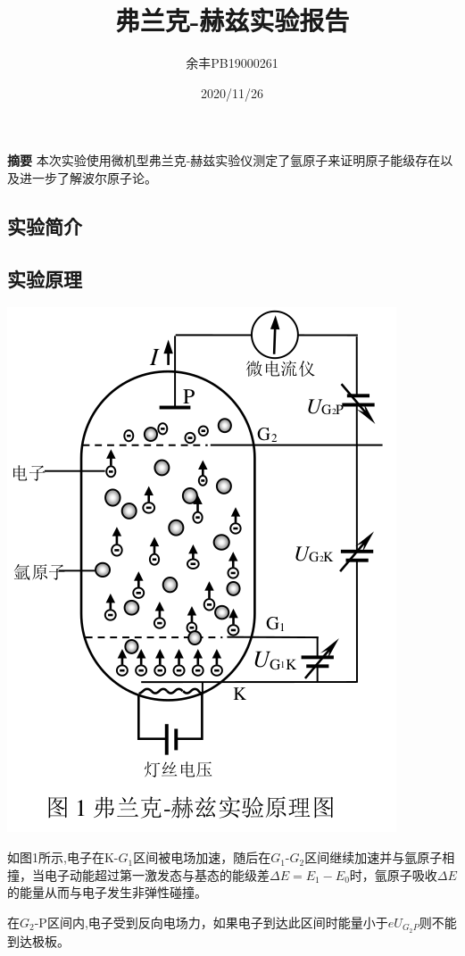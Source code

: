 \documentclass[UEF8]{ctexart}
\title{弗兰克-赫兹实验报告}
\author{余丰\quad PB19000261}
\date{2020/11/26}
\begin{document}
\maketitle

{\bfseries 摘要} \quad 本次实验使用微机型弗兰克-赫兹实验仪测定了氩原子来证明原子能级存在以及进一步了解波尔原子论。

\begin{multicols}{2}
\section{实验简介}
\subsection{实验原理}
\includegraphics[scale=0.42]{p1.png}

 如图1所示,电子在K-$G_{1}$区间被电场加速，随后在$G_{1}$-$G_{2}$区间继续加速并与氩原子相撞，当电子动能超过第一激发态与基态的能级差$\Delta{E}=E_{1}-E_{0}$时，氩原子吸收$\Delta{E}$的能量从而与电子发生非弹性碰撞。


在$G_{2}$-P区间内,电子受到反向电场力，如果电子到达此区间时能量小于$eU_{G_{2}P}$则不能到达极板。


\end{multicols}
\end{document}
